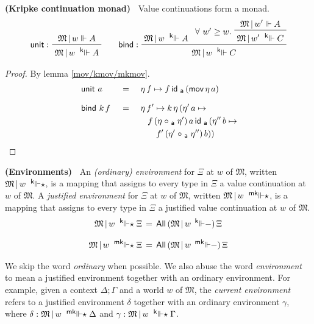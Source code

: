 \documentclass{entcs}
\numberwithin{equation}{thm}
\newcommand{\preop}[1]{\mathord{#1}-}
\newcommand{\tsf}[1]{\textsf{\upshape{#1}}}
\newcommand{\stsf}[1]{\tsf{\small{#1}}}
\renewcommand{\:}{\mathrel{:}}
\newcommand{\tyrule}[1]{\prftree[l]{${#1} \:\,$}}
\let\oldforall\forall
\renewcommand{\forall}{\oldforall\,}
\newcommand{\0}{\varnothing}
\newcommand{\All}{\operatorname{\tsf{All}}}
\newcommand{\M}{\mathfrak{M}}
\newcommand{\ida}{\operatorname{\tsf{id}_{\stsf{a}}}}
\newcommand{\compa}{\mathrel{\circ_{\stsf{a}}}}
\newcommand{\ee}{\mathrel{\Vdash}}
\newcommand{\kee}{\mathrel{^{\stsf{k}\mkern-6mu}\Vdash}}
\newcommand{\mkee}{\mathrel{^{\stsf{mk}\mkern-6mu}\Vdash}}
\newcommand{\kees}{\mathrel{^{\stsf{k}\mkern-6mu}\Vdash\mkern-5mu\star}}
\newcommand{\mkees}{\mathrel{^{\stsf{mk}\mkern-6mu}\Vdash\mkern-5mu\star}}
\newcommand{\mov}{\operatorname{\tsf{mov}}}
\newcommand{\unit}{\operatorname{\tsf{unit}}}
\newcommand{\bind}{\operatorname{\tsf{bind}}}
\begin{document}
\begin{lemma}
  \normalshape
  \textbf{(Kripke continuation monad)\ }
  \label{unit/bind}
  Value continuations form a monad.
  \begin{gather*}
    \tyrule{\unit}{\M\,|\,w \ee A}{\M\,|\,w \kee A}\qquad
    \tyrule{\bind}{\M\,|\,w \kee A}{\raisebox{8pt}{$\forall w' \ge w.\ $} \prftree{\M\,|\, w' \ee A}{\M\,|\, w' \kee C}}{\M\,|\,w \kee C}
  \end{gather*}
  \itshape
  \begin{proof}
    \normalshape
    By lemma \ref{mov/kmov/mkmov}.
    \begin{alignat*}{3}
      & \unit\,a      \,&&=\, &&\,\eta\, f \mapsto f \ida\, (\mov \eta\, a)\\[0.5\baselineskip]
      & \bind\, k\, f \,&&=\, &&\,\eta\, f' \mapsto k\, \eta\, (\eta'\, a \mapsto\\
      &                 &&    &&\quad f\, (\eta \compa \eta')\, a \ida\, (\eta''\, b \mapsto\\
      &                 &&    &&\quad\quad f'\, (\eta' \compa \eta'')\, b))
    \end{alignat*}
  \end{proof}
\end{lemma}

\begin{definition}
  \textbf{(Environments)\ }
  \label{kees/mkees}
  An \emph{(ordinary) environment} for $\Xi$ at $w$ of $\M$, written $\M\,|\,w \kees$, is a mapping that assigns to every type in $\Xi$ a value continuation at $w$ of $\M$.
  A \emph{justified environment} for $\Xi$ at $w$ of $\M$, written $\M\,|\,w \mkees$, is a mapping that assigns to every type in $\Xi$ a justified value continuation at $w$ of $\M$.
  \begin{gather*}
    \M\,|\,w \kees \Xi  \,=\, \All\, (\M\,|\,w\, \preop{\kee})\, \Xi\\[0.5\baselineskip]
    \M\,|\,w \mkees \Xi \,=\, \All\, (\M\,|\,w\, \preop{\mkee})\, \Xi
  \end{gather*}
\end{definition}

\noindent
We skip the word \emph{ordinary} when possible.  We also abuse the word \emph{environment} to mean a justified environment together with an ordinary environment.  For example, given a context $\Delta; \Gamma$ and a world $w$ of $\M$, the \emph{current environment} refers to a justified environment $\delta$ together with an ordinary environment $\gamma$, where $\delta : \M\,|\,w \mkees \Delta$ and $\gamma : \M\,|\,w \kees \Gamma$.
\end{document}
